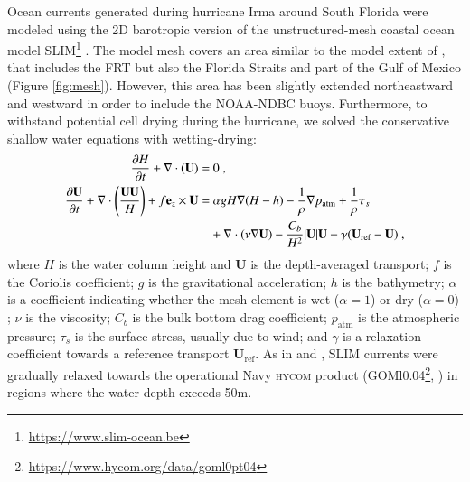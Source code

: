 \documentclass[preprint,12pt,authoryear]{elsarticle}
\newcommand{\hycom}{\textsc{hycom} }
\newcommand{\UV}{\mathbf{U}}
\begin{document}
Ocean currents generated during hurricane Irma around South Florida were modeled using the 2D barotropic version of the unstructured-mesh coastal ocean model SLIM\footnote{\url{https://www.slim-ocean.be}} \citep{lambrechts2008multi}. The model mesh covers an area similar to the model extent of \cite{dobbelaere2020coupled}, that includes the FRT but also the Florida Straits and part of the Gulf of Mexico (Figure \ref{fig:mesh}). However, this area has been slightly extended northeastward and westward in order to include the NOAA-NDBC buoys. Furthermore, to withstand potential cell drying during the hurricane, we solved the conservative shallow water equations with wetting-drying:
\begin{equation}
    \begin{split}
        \dfrac{\partial H}{\partial t} +\nabla\cdot(\UV) =& ~0~, \\
        \dfrac{\partial \UV}{\partial t}  + \nabla\cdot\left(\dfrac{\UV\UV}{H}\right) + f\mathbf{e}_z \times \UV =& ~\alpha gH\nabla(H-h) - \dfrac{1}{\rho}\nabla p_\text{atm} + \dfrac{1}{\rho}\text{\boldmath$\tau$}_s \\
         &+\nabla\cdot(\nu\nabla\UV) - \dfrac{C_b}{H^2}|\UV|\UV + \gamma(\UV_\text{ref}-\UV)~,
    \end{split} \label{eq:slim}
\end{equation}
where $H$ is the water column height and $\UV$ is the depth-averaged transport; $f$ is the Coriolis coefficient; $g$ is the gravitational acceleration; $h$ is the bathymetry; $\alpha$ is a coefficient indicating whether the mesh element is wet ($\alpha=1$) or dry ($\alpha=0$) \citep{le2020implicit}; $\nu$  is the viscosity; $C_b$ is the bulk bottom drag coefficient; $p_\text{atm}$ is the atmospheric pressure; {\boldmath$\tau$}$_s$ is the surface stress, usually due to wind; and $\gamma$ is a relaxation coefficient towards a reference transport $\UV_\text{ref}$. As in \cite{frys2020fine} and \cite{dobbelaere2020coupled}, SLIM currents were gradually relaxed towards the operational Navy \hycom product (GOMl0.04\footnote{\url{https://www.hycom.org/data/goml0pt04}}, \cite{chassignet2007hycom}) in regions where the water depth exceeds 50m.
\end{document}
